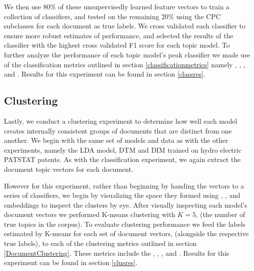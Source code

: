 We then use 80$\%$ of these unsupervisedly learned feature vectors to train a collection of classifiers, and tested on the remaining 20$\%$ using the CPC subclasses for each document as true labels. We cross validated each classifier to ensure more robust estimates of performance, and selected the results of the classifier with the highest cross validated F1 score for each topic model. To further analyze the performance of each topic model's peak classifier we made use of the classification metrics outlined in section \ref{classificationmetrics} namely , , , and . Results for this experiment can be found in section \ref{classres}.


\subsection{Clustering}
Lastly, we conduct a clustering experiment to determine how well each model creates internally consistent groups of documents that are distinct from one another. We begin with the same set of models and data as with the other experiments, namely the LDA model, DTM and DIM trained on hydro electric PATSTAT patents. As with the classification experiment, we again extract the document topic vectors for each document.

However for this experiment, rather than beginning by handing the vectors to a series of classifiers, we begin by visualizing the space they formed using , , and  embeddings to inspect the clusters by eye. After visually inspecting each model's document vectors we performed K-means clustering with $K=5$, (the number of true topics in the corpus). To evaluate clustering performance we feed the labels estimated by K-means for each set of document vectors, (alongside the respective true labels), to each of the clustering metrics outlined in section \ref{DocumentClustering}. These metrics include the , , ,  and . Results for this experiment can be found in section \ref{clusres}.

